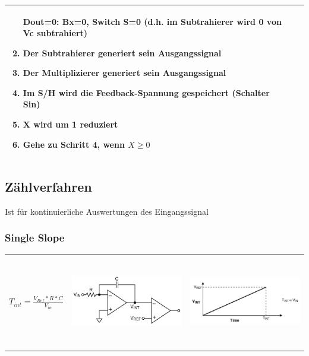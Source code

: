 \begin{longtable}{|l|l|l|}
\begin{minipage}{8cm}
\begin{enumerate}
  Dout=0: Bx=0, Switch S=0 (d.h. im Subtrahierer wird 0 von Vc
  subtrahiert)
  \item Der Subtrahierer generiert sein Ausgangssignal
  \item Der Multiplizierer generiert sein Ausgangssignal
  \item Im S/H wird die Feedback-Spannung gespeichert (Schalter Sin)
  \item X wird um 1 reduziert
  \item Gehe zu Schritt 4, wenn $X\geq0$
\end{enumerate}
\end{minipage}
\\
\hline
\end{longtable}



\subsection{Zählverfahren } 
Ist für kontinuierliche Auswertungen des Eingangssignal
\subsubsection{Single Slope}

\begin{tabular}{l|p{}p{}}
$T_{int}=\frac{V_{Ref}*R*C}{V_{in}}$
&
\parbox[c][6cm]{0.31\textwidth}{\includegraphics[width=6cm, height=4cm]{pictures/singleSlope1}}
&
\parbox[c][6cm]{0.31\textwidth}{\includegraphics[width=6cm, height=3cm]{pictures/singleSlope2}}
\\ 
\end{tabular}


